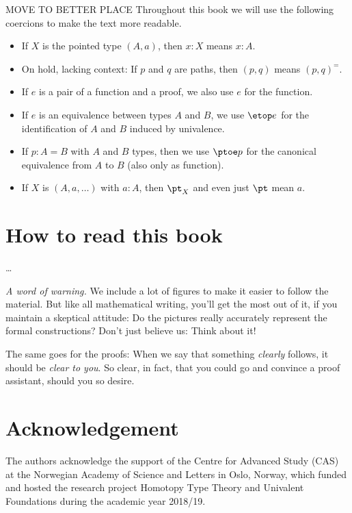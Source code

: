MOVE TO BETTER PLACE
Throughout this book we will use the following coercions to make the text more readable.
\begin{itemize}[noitemsep]
\item If $X$ is the pointed type $(A,a)$, then $x:X$ means $x:A$.
\item On hold, lacking context: If $p$ and $q$ are paths, then $(p,q)$ means $(p,q)^=$.
\item If $e$ is a pair of a function and a proof, we also use $e$ for the function.
\item If $e$ is an equivalence between types $A$ and $B$, we use $\etop e$ for the
identification of $A$ and $B$ induced by univalence.
\item If $p: A= B$ with $A$ and $B$ types, then we use $\ptoe p$ for the canonical
equivalence from $A$ to $B$ (also only as function).
\item If $X$ is $(A,a,\ldots)$ with $a:A$, then $\pt_X$ and even just $\pt$ mean $a$.
\end{itemize}

\bigskip

\section*{How to read this book}

\ldots

\noindent\emph{A word of warning.}\enspace
We include a lot of figures to make it easier to follow the material.
But like all mathematical writing, you'll get the most out of it,
if you maintain a skeptical attitude:
Do the pictures really accurately represent the formal constructions?
Don't just believe us: Think about it!

The same goes for the proofs: When we say that something \emph{clearly} follows,
it should be \emph{clear to you}.
So clear, in fact, that you could go and convince a proof assistant,
should you so desire.

\section*{Acknowledgement}
The authors acknowledge the support of the Centre for Advanced Study (CAS)
at the Norwegian Academy of Science and Letters
in Oslo, Norway, which funded and hosted the research project Homotopy
Type Theory and Univalent Foundations during the academic year 2018/19.



